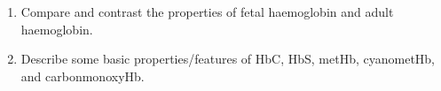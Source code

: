 \begin{enumerate}
\item Compare and contrast the properties of fetal haemoglobin and adult haemoglobin.


\item Describe some basic properties/features of HbC, HbS, metHb, cyanometHb, and carbonmonoxyHb.


\end{enumerate}
